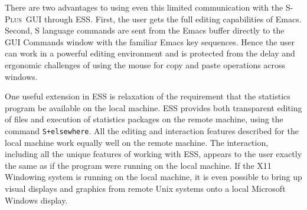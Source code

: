 \documentclass{article}
\newcommand*{\Splus}{\textsc{S-Plus}}
\newcommand{\stexttt}[1]{{\small\texttt{#1}}}
\newenvironment{Comment}{\begin{quote}\small\itshape }{\end{quote}}
\begin{document}
There are two %
advantages to using even this limited communication with the \Splus\ 
GUI through ESS.  First, the user gets the full editing capabilities
of Emacs.  Second, S language commands are sent from the Emacs buffer
directly to the GUI Commands window with the familiar Emacs
key sequences.  Hence the user can work in a powerful editing environment
and is protected from the delay and ergonomic challenges of using the
mouse for copy and paste operations across windows.


One useful extension in ESS is relaxation of the requirement that the
statistics program be available on the local machine.  ESS provides
both transparent editing of files and execution of statistics packages
on the remote machine, using the command \stexttt{S+elsewhere}.
All the editing and interaction features described for the local
machine work equally well on the remote machine.  The interaction,
including all the unique features of working with ESS, appears to the
user exactly the same as if the program were running on the local
machine.  If the X11 Windowing system is running on the local machine,
it is even possible to bring up visual displays and graphics from
remote Unix systems onto a local Microsoft Windows display.


\end{document}
